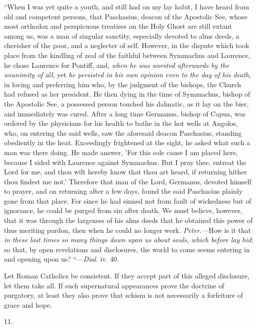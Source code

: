 ``When I was yet
quite a youth, and still had on my lay habit, I have heard from old
and competent persons, that Paschasius, deacon of the Apostolic See,
whose most orthodox and perspicuous treatises on the Holy Ghost are
still extant among us, was a man of singular sanctity, especially
devoted to alms deeds, a cherisher of the poor, and a neglecter of
self. However, in the dispute which took place from the kindling of
zeal of the faithful between Symmachus and Laurence, he chose Laurence
for Pontiff, and, \emph{when he was worsted afterwards by the unanimity
of all}, yet \emph{he persisted in his own opinion even to the day of
his death}, in loving and preferring him who, by the judgment of
the bishops, the Church had refused as her president. He then dying in
the time of Symmachus, bishop of the Apostolic See, a possessed person
touched his dalmatic, as it lay on the bier, and immediately was
cured. After a long time Germanus, bishop of Capua, was ordered
by the physicians for his health to bathe in the hot wells at Angolos,
who, on entering the said wells, saw the aforesaid deacon Paschasius,
standing obediently in the heat. Exceedingly frightened at the sight,
he asked what such a man was there doing. He made answer, 'For this
sole cause I am placed here, because I sided with Laurence against
Symmachus. But I pray thee, entreat the Lord for me, and thou wilt
hereby know that thou art heard, if returning hither thou findest me
not.' Therefore that man of the Lord, Germanus, devoted himself to
prayer, and on returning after a few days, found the said Paschasius
plainly gone from that place. For since he had sinned not from fault
of wickedness but of ignorance, he could be purged from sin after
death. We must believe, however, that it was through the largeness of
his alms deeds that he obtained this power of thus meriting pardon,
then when he could no longer work. \emph{Peter}.—How is it that \emph{in
these last times so many things dawn upon us about souls, which before
lay hid}; so that, by open revelations and disclosures, the world
to come seems entering in and opening upon us? ``—\emph{Dial}. iv.
40.

Let Roman Catholics be consistent. If they accept
part of this alleged disclosure, let them take all. If such
supernatural appearances prove the doctrine of purgatory, at least
they also prove that schism is not necessarily a forfeiture of grace
and hope.

11.

